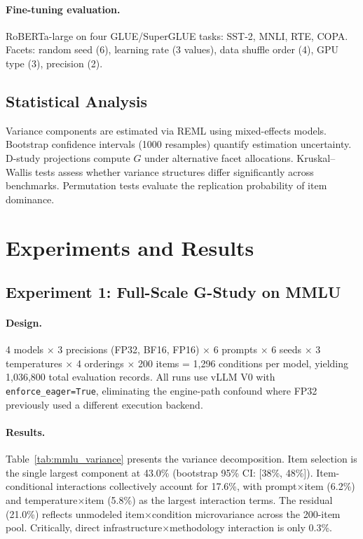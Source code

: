 \documentclass[11pt]{article}
\newcommand{\gcoeff}{G}
\begin{document}
\paragraph{Fine-tuning evaluation.}
RoBERTa-large on four GLUE/SuperGLUE tasks: SST-2, MNLI, RTE, COPA.
Facets: random seed (6), learning rate (3 values), data shuffle order (4), GPU type (3), precision (2).

\subsection{Statistical Analysis}

Variance components are estimated via REML using mixed-effects models.
Bootstrap confidence intervals (1000 resamples) quantify estimation uncertainty.
D-study projections compute $\gcoeff$ under alternative facet allocations.
Kruskal--Wallis tests assess whether variance structures differ significantly across benchmarks.
Permutation tests evaluate the replication probability of item dominance.

\section{Experiments and Results}

\subsection{Experiment 1: Full-Scale G-Study on MMLU}
\label{sec:exp1}

\paragraph{Design.}
4 models $\times$ 3 precisions (FP32, BF16, FP16) $\times$ 6 prompts $\times$ 6 seeds $\times$ 3 temperatures $\times$ 4 orderings $\times$ 200 items = 1,296 conditions per model, yielding 1,036,800 total evaluation records.
All runs use vLLM V0 with \texttt{enforce\_eager=True}, eliminating the engine-path confound where FP32 previously used a different execution backend.

\paragraph{Results.}
Table~\ref{tab:mmlu_variance} presents the variance decomposition.
Item selection is the single largest component at 43.0\% (bootstrap 95\% CI: [38\%, 48\%]).
Item-conditional interactions collectively account for 17.6\%, with prompt$\times$item (6.2\%) and temperature$\times$item (5.8\%) as the largest interaction terms.
The residual (21.0\%) reflects unmodeled item$\times$condition microvariance across the 200-item pool.
Critically, direct infrastructure$\times$methodology interaction is only 0.3\%.
\end{document}
